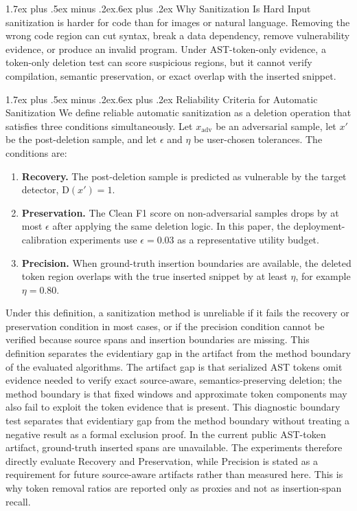\documentclass[letterpaper,twocolumn,10pt,twoside]{article}
\makeatletter
\renewcommand\subsection{\@startsection{subsection}{2}{\z@}%
  {1.7ex plus .5ex minus .2ex}{.6ex plus .2ex}%
  {\normalfont\normalsize\bfseries}}
\newcounter{algorithm}
\newcommand{\cleanf}{Clean F1}
\makeatother
\begin{document}
\subsection{Why Sanitization Is Hard}
Input sanitization is harder for code than for images or natural language. Removing the wrong code region can cut syntax, break a data dependency, remove vulnerability evidence, or produce an invalid program. Under AST-token-only evidence, a token-only deletion test can score suspicious regions, but it cannot verify compilation, semantic preservation, or exact overlap with the inserted snippet.

\subsection{Reliability Criteria for Automatic Sanitization}
\label{sec:reliable-sanitization}
We define reliable automatic sanitization as a deletion operation that satisfies three conditions simultaneously. Let $x_{\mathrm{adv}}$ be an adversarial sample, let $x'$ be the post-deletion sample, and let $\epsilon$ and $\eta$ be user-chosen tolerances. The conditions are:
\begin{enumerate}
  \item \textbf{Recovery.} The post-deletion sample is predicted as vulnerable by the target detector, $\mathrm{D}(x')=1$.
  \item \textbf{Preservation.} The \cleanf{} score on non-adversarial samples drops by at most $\epsilon$ after applying the same deletion logic. In this paper, the deployment-calibration experiments use $\epsilon=0.03$ as a representative utility budget.
  \item \textbf{Precision.} When ground-truth insertion boundaries are available, the deleted token region overlaps with the true inserted snippet by at least $\eta$, for example $\eta=0.80$.
\end{enumerate}
Under this definition, a sanitization method is unreliable if it fails the recovery or preservation condition in most cases, or if the precision condition cannot be verified because source spans and insertion boundaries are missing. This definition separates the evidentiary gap in the artifact from the method boundary of the evaluated algorithms. The artifact gap is that serialized AST tokens omit evidence needed to verify exact source-aware, semantics-preserving deletion; the method boundary is that fixed windows and approximate token components may also fail to exploit the token evidence that is present. This diagnostic boundary test separates that evidentiary gap from the method boundary without treating a negative result as a formal exclusion proof.
In the current public AST-token artifact, ground-truth inserted spans are unavailable. The experiments therefore directly evaluate Recovery and Preservation, while Precision is stated as a requirement for future source-aware artifacts rather than measured here. This is why token removal ratios are reported only as proxies and not as insertion-span recall.
\end{document}
